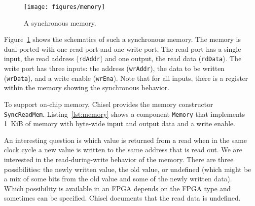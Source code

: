 \documentclass[%
    10pt,
    headinclude, footexclude,
    openright, %
    notitlepage,
    cleardoubleempty,
    headsepline,
    pointlessnumbers,
    bibtotoc, idxtotoc,
    ]{scrbook}
\newcommand{\code}[1]{{\small{\texttt{#1}}}}
\begin{document}
\begin{figure}
  \centering
  \texttt{[image: figures/memory]}
  \caption{A synchronous memory.}
  \label{fig:memory}
\end{figure}

Figure~\ref{fig:memory} shows the schematics of such a synchronous memory.
The memory is dual-ported with one read port and one write port.
The read port has a single input, the read address (\code{rdAddr}) and
one output, the read data (\code{rdData}).
The write port has three inputs: the address (\code{wrAddr}), the data
to be written (\code{wrData}), and a write enable (\code{wrEna}).
Note that for all inputs, there is a register within the memory showing the
synchronous behavior.

To support on-chip memory, Chisel provides the memory constructor \code{SyncReadMem}.
Listing~\ref{lst:memory} shows a component \code{Memory} that implements
1~KiB of memory with byte-wide input and output data and a write enable. 


An interesting question is which value is returned from a read when in the same clock
cycle a new value is written to the same address that is read out.
We are interested in the read-during-write behavior of the memory.
There are three possibilities: the newly written value, the old value, or undefined
(which might be a mix of some bits from the old value and some of the newly written data).
Which possibility is available in an FPGA depends on the FPGA type and
sometimes can be specified.
Chisel documents that the read data is undefined.
\end{document}
